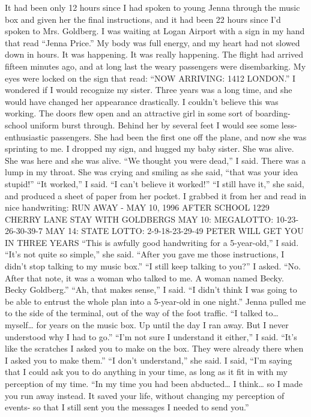 \documentclass[a4paper]{article}
\begin{document}
It had been only 12 hours since I had spoken to young Jenna through the music box and given her the final instructions, and it had been 22 hours since I’d spoken to Mrs. Goldberg.
I was waiting at Logan Airport with a sign in my hand that read “Jenna Price.” My body was full energy, and my heart had not slowed down in hours. It was happening. It was really happening.
The flight had arrived fifteen minutes ago, and at long last the weary passengers were disembarking. My eyes were locked on the sign that read: “NOW ARRIVING: 1412 LONDON.”
I wondered if I would recognize my sister. Three years was a long time, and she would have changed her appearance drastically. I couldn’t believe this was working.
The doors flew open and an attractive girl in some sort of boarding-school uniform burst through. Behind her by several feet I would see some less-enthusiastic passengers. She had been the first one off the plane, and now she was sprinting to me.
I dropped my sign, and hugged my baby sister. She was alive. She was here and she was alive.
“We thought you were dead,” I said. There was a lump in my throat.
She was crying and smiling as she said, “that was your idea stupid!”
“It worked,” I said. “I can’t believe it worked!”
“I still have it,” she said, and produced a sheet of paper from her pocket.
I grabbed it from her and read in nice handwriting:
RUN AWAY - MAY 10, 1996
AFTER SCHOOL
1229 CHERRY LANE
STAY WITH GOLDBERGS
MAY 10: MEGALOTTO: 10-23-26-30-39-7
MAY 14: STATE LOTTO: 2-9-18-23-29-49
PETER WILL GET YOU IN THREE YEARS
“This is awfully good handwriting for a 5-year-old,” I said.
“It’s not quite so simple,” she said. “After you gave me those instructions, I didn’t stop talking to my music box.”
“I still keep talking to you?” I asked.
“No. After that note, it was a woman who talked to me. A woman named Becky. Becky Goldberg.”
“Ah, that makes sense,” I said. “I didn’t think I was going to be able to entrust the whole plan into a 5-year-old in one night.”
Jenna pulled me to the side of the terminal, out of the way of the foot traffic. “I talked to… myself… for years on the music box. Up until the day I ran away. But I never understood why I had to go.”
“I’m not sure I understand it either,” I said. “It’s like the scratches I asked you to make on the box. They were already there when I asked you to make them.”
“I don’t understand,” she said.
I said, “I’m saying that I could ask you to do anything in your time, as long as it fit in with my perception of my time.
“In my time you had been abducted… I think… so I made you run away instead. It saved your life, without changing my perception of events- so that I still sent you the messages I needed to send you.”
\end{document}
